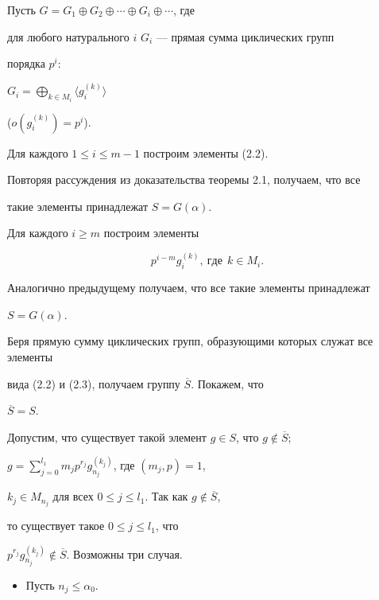 \begin{pf}


Пусть $G=G_1\oplus G_2\oplus\dotsb\oplus G_i\oplus\dotsb$, где


для любого натурального $i$\; $G_i$ --- прямая сумма циклических групп


порядка $p^i$:


$G_i=\bigoplus\limits_{k\in M_i}\langle g_i^{(k)}\rangle$


($o(g_i^{(k)})=p^i$).





Для каждого $1\leq i\leq m-1$ построим элементы (2.2).


Повторяя рассуждения из доказательства теоремы 2.1, получаем, что все


такие элементы принадлежат $S=G(\alpha)$.





Для каждого $i\geq m$ построим элементы


\begin{equation}


p^{i-m}g_i^{(k)},\ {где}\ \ k\in M_i.


\end{equation}


Аналогично предыдущему получаем, что все такие элементы принадлежат


$S=G(\alpha)$.





Беря прямую сумму циклических групп, образующими которых служат все элементы


вида (2.2) и (2.3), получаем группу $\overline{S}$. Покажем, что


$\overline{S}=S$.


Допустим, что существует такой элемент $g\in S$, что $g\notin\overline{S}$;


$g=\sum\limits_{j=0}^{l_1} m_j p^{r_j} g_{n_j}^{(k_j)}$, где $(m_j,p)=1$,


$k_j\in M_{n_j}$ для всех $0\leq j\leq l_1$. Так как $g\notin\overline{S}$,


то существует такое $0\leq j\leq l_1$, что


$p^{r_j} g_{n_j}^{(k_j)}\not\in\overline{S}$. Возможны три случая.


\begin{itemize}


\item[1.] Пусть $n_j\le \alpha_0$.



\end{itemize}
\end{pf}
